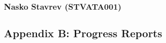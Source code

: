 \subsubsection*{Nasko Stavrev (STVATA001)}

\newpage
\subsection*{Appendix B: Progress Reports}





